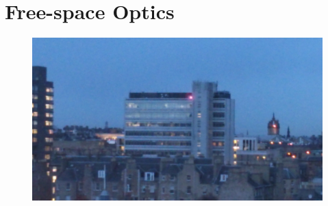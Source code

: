 
\section{Free-space Optics}
\label{sec:fso}

\begin{figure}
  \includegraphics[width=\textwidth]{at-laser.jpg}
\end{figure}
